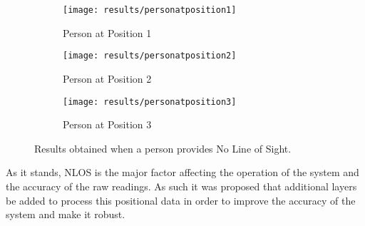 \begin{figure}[h!]
    \centering
    \begin{subfigure}{0.45\textwidth}
            \texttt{[image: results/personatposition1]}
            \caption{Person at Position 1}
    \end{subfigure}
    \begin{subfigure}{0.45\textwidth}
            \texttt{[image: results/personatposition2]}
            \caption{Person at Position 2}
    \end{subfigure}
    \begin{subfigure}{0.45\textwidth}
            \texttt{[image: results/personatposition3]}
            \caption{Person at Position 3}
    \end{subfigure}
    \caption{Results obtained when a person provides No Line of Sight.}
    \label{fig:persons}
\end{figure}
As it stands, NLOS is the major factor affecting the operation of the system and the accuracy of the raw readings.
As such it was proposed that additional layers be added to process this positional data in order to improve the accuracy of the system and make it robust.

